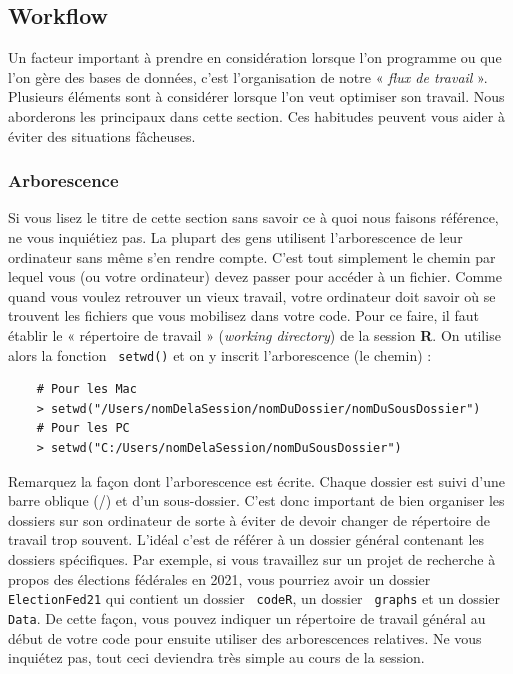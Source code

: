 \documentclass[10.5pt,a4paper]{article}
\newcommand{\rcode}[1]{\texttt{\color{rstudio} #1}}
\begin{document}
  \subsection{Workflow}
  
  Un facteur important à prendre en considération lorsque l'on programme ou que l'on gère des bases de données, c'est l'organisation de notre « \emph{flux de travail} ». Plusieurs éléments sont à considérer lorsque l'on veut optimiser son travail. Nous aborderons les principaux dans cette section. Ces habitudes peuvent vous aider à éviter des situations fâcheuses.
  
    \subsubsection{Arborescence}
    Si vous lisez le titre de cette section sans savoir ce à quoi nous faisons référence, ne vous inquiétiez pas. La plupart des gens utilisent l'arborescence de leur ordinateur sans même s'en rendre compte. C'est tout simplement le chemin par lequel vous (ou votre ordinateur) devez passer pour accéder à un fichier. Comme quand vous voulez retrouver un vieux travail, votre ordinateur doit savoir où se trouvent les fichiers que vous mobilisez dans votre code. Pour ce faire, il faut établir le « répertoire de travail » (\emph{working directory}) de la session \textbf{R}. On utilise alors la fonction \rcode{setwd()} et on y inscrit l'arborescence (le chemin) :
    
    \begin{lstlisting}
    # Pour les Mac
    > setwd("/Users/nomDelaSession/nomDuDossier/nomDuSousDossier")
    # Pour les PC
    > setwd("C:/Users/nomDelaSession/nomDuSousDossier")
    \end{lstlisting}
    
    Remarquez la façon dont l'arborescence est écrite. Chaque dossier est suivi d'une barre oblique (/) et d'un sous-dossier. C'est donc important de bien organiser les dossiers sur son ordinateur de sorte à éviter de devoir changer de répertoire de travail trop souvent. L'idéal c'est de référer à un dossier général contenant les dossiers spécifiques. Par exemple, si vous travaillez sur un projet de recherche à propos des élections fédérales en 2021, vous pourriez avoir un dossier \rcode{ElectionFed21} qui contient un dossier \rcode{codeR}, un dossier \rcode{graphs} et un dossier \rcode{Data}. De cette façon, vous pouvez indiquer un répertoire de travail général au début de votre code pour ensuite utiliser des arborescences relatives. Ne vous inquiétez pas, tout ceci deviendra très simple au cours de la session.
    
\end{document}
